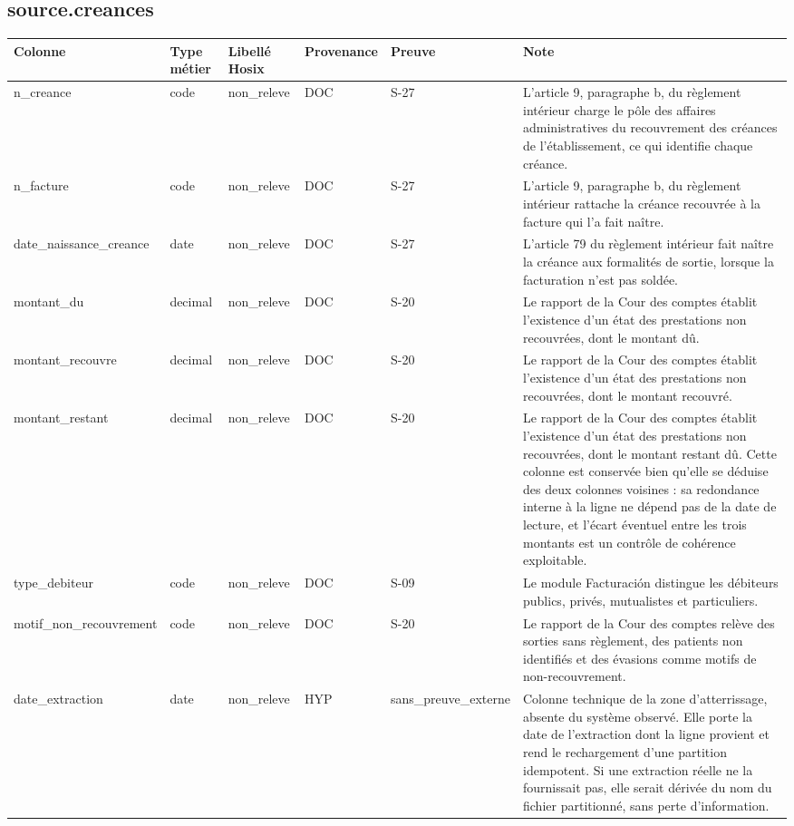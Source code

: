 \subsection*{source.creances}
\begin{longtable}{p{2.5cm}p{1.8cm}p{2.8cm}p{1.3cm}p{2.2cm}p{5cm}}
\hline
Colonne & Type métier & Libellé Hosix & Provenance & Preuve & Note \\
\hline
\endhead
n\_creance & code & non\_releve & DOC & S-27 & L'article 9, paragraphe b, du règlement intérieur charge le pôle des affaires administratives du recouvrement des créances de l'établissement, ce qui identifie chaque créance. \\
n\_facture & code & non\_releve & DOC & S-27 & L'article 9, paragraphe b, du règlement intérieur rattache la créance recouvrée à la facture qui l'a fait naître. \\
date\_naissance\_creance & date & non\_releve & DOC & S-27 & L'article 79 du règlement intérieur fait naître la créance aux formalités de sortie, lorsque la facturation n'est pas soldée. \\
montant\_du & decimal & non\_releve & DOC & S-20 & Le rapport de la Cour des comptes établit l'existence d'un état des prestations non recouvrées, dont le montant dû. \\
montant\_recouvre & decimal & non\_releve & DOC & S-20 & Le rapport de la Cour des comptes établit l'existence d'un état des prestations non recouvrées, dont le montant recouvré. \\
montant\_restant & decimal & non\_releve & DOC & S-20 & Le rapport de la Cour des comptes établit l'existence d'un état des prestations non recouvrées, dont le montant restant dû. Cette colonne est conservée bien qu'elle se déduise des deux colonnes voisines : sa redondance interne à la ligne ne dépend pas de la date de lecture, et l'écart éventuel entre les trois montants est un contrôle de cohérence exploitable. \\
type\_debiteur & code & non\_releve & DOC & S-09 & Le module Facturación distingue les débiteurs publics, privés, mutualistes et particuliers. \\
motif\_non\_recouvrement & code & non\_releve & DOC & S-20 & Le rapport de la Cour des comptes relève des sorties sans règlement, des patients non identifiés et des évasions comme motifs de non-recouvrement. \\
date\_extraction & date & non\_releve & HYP & sans\_preuve\_externe & Colonne technique de la zone d'atterrissage, absente du système observé. Elle porte la date de l'extraction dont la ligne provient et rend le rechargement d'une partition idempotent. Si une extraction réelle ne la fournissait pas, elle serait dérivée du nom du fichier partitionné, sans perte d'information. \\
\hline
\end{longtable}

